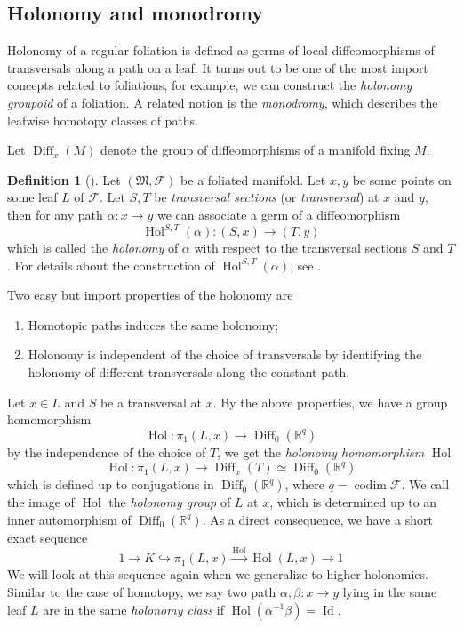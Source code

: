 \documentclass[12pt]{amsart}
\theoremstyle{definition}
\newtheorem{defn}[thm]{Definition}
\theoremstyle{remark}
\numberwithin{equation}{section}
\newcommand{\CF}{{\mathcal F}}
\newcommand{\R}{{\mathbb{R}}}
\newcommand{\1}{{\mathbb{1}}}
\newcommand{\Diff}{\operatorname{Diff}}
\newcommand{\M}{{\mathfrak{M}}}
\newcommand{\id}{\operatorname{Id}}
\newcommand{\codim}{\operatorname{codim}}
\newcommand{\hol}{\operatorname{Hol}}
\begin{document}
\subsection{Holonomy and monodromy}
Holonomy of a regular foliation is defined as germs of local diffeomorphisms of transversals along a path on a leaf. It turns out to be one of the most import concepts related to foliations, for example, we can construct the {\it holonomy groupoid} of a foliation. A related notion is the {\it monodromy}, which describes the leafwise homotopy classes of paths.

Let $\Diff_x(M)$ denote the group of diffeomorphisms of a manifold fixing $M$. 
\begin{defn}[\cite{MM03}]
    Let $(\M, \CF)$ be a foliated manifold. Let $x, y$ be some points on some leaf $L$ of $\CF$. Let $S, T$ be {\it transversal sections} (or {\it transversal}) at $x$ and $y$, then for any path $\alpha:x\to y$ we can associate a germ of a diffeomorphism 
    $$
    \hol^{S,T}(\alpha): (S,x) \to (T,y)
    $$
    which is called the {\it holonomy} of $\alpha$ with respect to the transversal sections $S$ and $T$. For details about the construction of $\hol^{S,T}(\alpha)$, see \cite[Section 2.1]{MM03}.
\end{defn}
Two easy but import properties of the holonomy are \begin{enumerate}
    \item Homotopic paths induces the same holonomy;
    \item Holonomy is independent of the choice of transversals by identifying the holonomy of different transversals along the constant path.
\end{enumerate}
Let $x\in L$ and $S$ be a transversal at $x$. By the above properties, we have a group homomorphism
$$
\hol: \pi_1(L, x) \to \Diff_0(\R^q)
$$
by the independence of the choice of $T$, we get the {\it holonomy homomorphism} $\hol$
\begin{equation*}
    \hol: \pi_1(L, x) \to \Diff_x(T)\simeq \Diff_0(\R^q)
\end{equation*}
which is defined up to conjugations in $\Diff_0(\R^q)$, where $q =\codim \CF$. We call the image of $\hol$ the {\it holonomy group} of $L$ at $x$, which is determined up to an inner automorphism of $\Diff_0(\R^q)$. As a direct consequence, we have a short exact sequence 
\begin{equation*}
    1\to K \hookrightarrow \pi_1(L,x) \stackrel{\hol}{\to} \hol(L,x) \to 1
\end{equation*}
We will look at this sequence again when we generalize to higher holonomies. Similar to the case of homotopy, we say two path $\alpha, \beta: x\to y$ lying in the same leaf $L$ are in the same {\it holonomy class} if $\hol(\alpha^{-1}\beta) = \id$.
\end{document}
